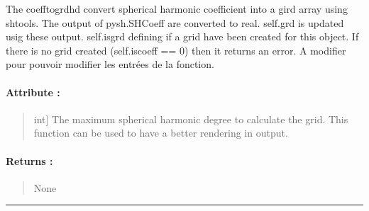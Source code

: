 \documentclass[letterpaper,10pt,english]{sphinxmanual}
\begin{document}
\begin{fulllineitems}
\label{\detokenize{spharm_doc:SL_C0de.spharm.sphericalobject.coefftogrdhd}}
\pysigstartsignatures
{}
\pysigstopsignatures
\sphinxAtStartPar
The \label{\detokenize{spharm_doc:coefftogrdhd}}coefftogrdhd convert spherical harmonic coefficient into a gird array using shtools.
The output of pysh.SHCoeff are converted to real.
self.grd is updated usig these output.
self.isgrd defining if a grid have been created for this object. 
If there is no grid created (self.iscoeff == 0) then it returns an error.
A modifier pour pouvoir modifier les entrées de la fonction.


\paragraph{Attribute :}
\label{\detokenize{spharm_doc:id4}}\begin{quote}
\begin{description}
\sphinxlineitem{max\_calc\_deg}{[}int{]}
\sphinxAtStartPar
The maximum spherical harmonic degree to calculate the grid. This function can be used to have a better rendering in output.

\end{description}
\end{quote}


\paragraph{Returns :}
\label{\detokenize{spharm_doc:id5}}\begin{quote}

\sphinxAtStartPar
None
\end{quote}

\end{fulllineitems}



\bigskip\hrule\bigskip

\end{document}
